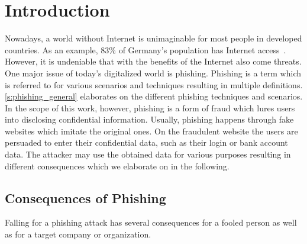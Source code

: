\section{Introduction}
\label{s:introduction}
Nowadays, a world without Internet is unimaginable for most people in developed countries.
As an example, 83\% of Germany's population has Internet access~\cite{globalfinance2012internetusage}. 
However, it is undeniable that with the benefits of the Internet also come threats. 
One major issue of today's digitalized world is phishing. 
Phishing is a term which is referred to for various scenarios and techniques resulting in multiple definitions.
\autoref{s:phishing_general} elaborates on the different phishing techniques and scenarios.
In the scope of this work, however, phishing is a form of fraud which lures users into disclosing confidential information. 
Usually, phishing happens through fake websites which imitate the original ones.
On the fraudulent website the users are persuaded to enter their confidential data, such as their login or bank account data.
The attacker may use the obtained data for various purposes resulting in different consequences which we elaborate on in the following.

\subsection{Consequences of Phishing}
Falling for a phishing attack has several consequences for a fooled person as well as for a target company or organization.

